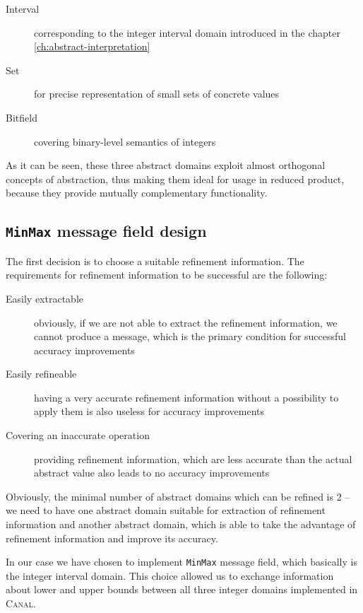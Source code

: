 \documentclass[12pt,oneside]{fithesis2}
\theoremstyle{definition}
\begin{document}
\begin{description}
  \item[Interval] corresponding to the integer interval domain introduced in the chapter \ref{ch:abstract-interpretation}
  \item[Set] for precise representation of small sets of concrete values
  \item[Bitfield] covering binary-level semantics of integers
\end{description}

As it can be seen, these three abstract domains exploit almost orthogonal concepts of abstraction, thus making them ideal for usage in reduced product, because they provide mutually complementary functionality.

\subsection{\texttt{MinMax} message field design}

The first decision is to choose a suitable refinement information. The requirements for refinement information to be successful are the following:

\begin{description}
  \item[Easily extractable] obviously, if we are not able to extract the refinement information, we cannot produce a message, which is the primary condition for successful accuracy improvements
  \item[Easily refineable] having a very accurate refinement information without a possibility to apply them is also useless for accuracy improvements
  \item[Covering an inaccurate operation] providing refinement information, which are less accurate than the actual abstract value also leads to no accuracy improvements
\end{description}

Obviously, the minimal number of abstract domains which can be refined is 2 -- we need to have one abstract domain suitable for extraction of refinement information and another abstract domain, which is able to take the advantage of refinement information and improve its accuracy.

In our case we have chosen to implement \texttt{MinMax} message field, which basically is the integer interval domain. This choice allowed us to exchange information about lower and upper bounds between all three integer domains implemented in \textsc{Canal}.
\end{document}
